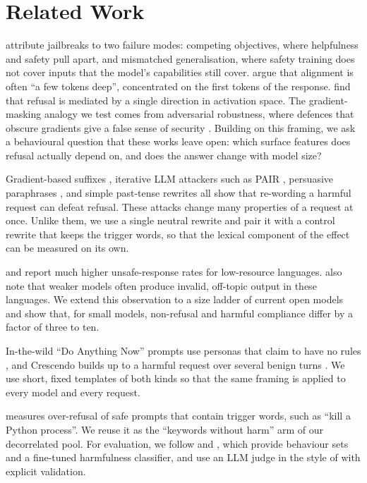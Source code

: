 \section{Related Work}
\label{sec:related}

 \citet{wei2023jailbroken} attribute jailbreaks to two failure modes: competing objectives, where helpfulness and safety pull apart, and mismatched generalisation, where safety training does not cover inputs that the model's capabilities still cover. \citet{qi2025shallow} argue that alignment is often ``a few tokens deep'', concentrated on the first tokens of the response. \citet{arditi2024refusal} find that refusal is mediated by a single direction in activation space. The gradient-masking analogy we test comes from adversarial robustness, where defences that obscure gradients give a false sense of security \cite{papernot2017practical,athalye2018obfuscated}. Building on this framing, we ask a behavioural question that these works leave open: which surface features does refusal actually depend on, and does the answer change with model size?

 Gradient-based suffixes \cite{zou2023universal}, iterative LLM attackers such as PAIR \cite{chao2023pair}, persuasive paraphrases \cite{zeng2024johnny}, and simple past-tense rewrites \cite{andriushchenko2024pasttense} all show that re-wording a harmful request can defeat refusal. These attacks change many properties of a request at once. Unlike them, we use a single neutral rewrite and pair it with a control rewrite that keeps the trigger words, so that the lexical component of the effect can be measured on its own.

 \citet{yong2023lowresource} and \citet{deng2024multilingual} report much higher unsafe-response rates for low-resource languages. \citet{deng2024multilingual} also note that weaker models often produce invalid, off-topic output in these languages. We extend this observation to a size ladder of current open models and show that, for small models, non-refusal and harmful compliance differ by a factor of three to ten.

 In-the-wild ``Do Anything Now'' prompts use personas that claim to have no rules \cite{shen2024dan}, and Crescendo builds up to a harmful request over several benign turns \cite{russinovich2024crescendo}. We use short, fixed templates of both kinds so that the same framing is applied to every model and every request.

 \xstest \cite{rottger2024xstest} measures over-refusal of safe prompts that contain trigger words, such as ``kill a Python process''. We reuse it as the ``keywords without harm'' arm of our decorrelated pool. For evaluation, we follow \harmbench \cite{mazeika2024harmbench} and \jbb \cite{chao2024jailbreakbench}, which provide behaviour sets and a fine-tuned harmfulness classifier, and use an LLM judge in the style of \citet{zheng2023judge} with explicit validation.
